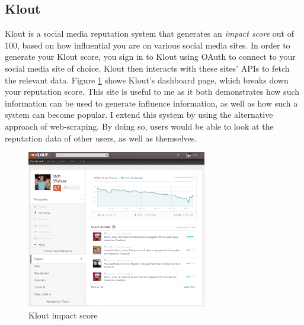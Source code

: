 

\subsection{Klout}

Klout \cite{klout_site} is a social media reputation system that generates an \textit{impact score} out of 100, based on how influential you are on various social media sites. In order to generate your Klout score, you sign in to Klout using OAuth to connect to your social media site of choice. Klout then interacts with these sites' APIs to fetch the relevant data. Figure \ref{fig:KLOUT} shows Klout's dashboard page, which breaks down your reputation score. This site is useful to me as it both demonstrates how such information can be used to generate influence information, as well as how such a system can become popular. I extend this system by using the alternative approach of web-scraping. By doing so, users would be able to look at the reputation data of other users, as well as themselves. 

\begin{figure}[h!]
\centering
\includegraphics[width=0.7\textwidth]{Images/klout.png}
\caption{Klout impact score}
\label{fig:KLOUT}
\end{figure}

